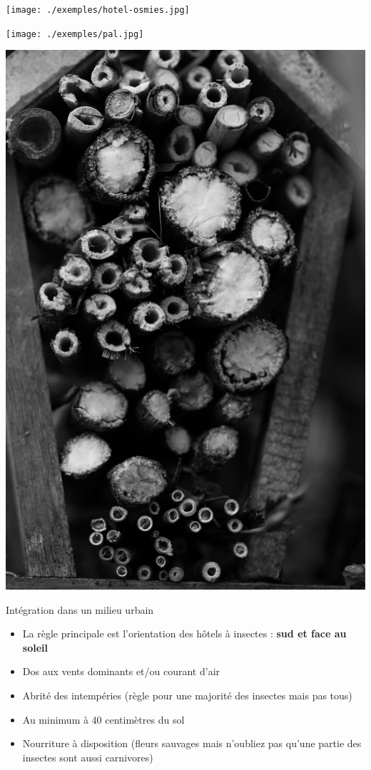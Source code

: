 \documentclass{beamer}
\begin{document}
\begin{frame}
        \texttt{[image: ./exemples/hotel-osmies.jpg]}
\end{frame}
\begin{frame}
        \texttt{[image: ./exemples/pal.jpg]}
\end{frame}
\begin{frame}
        \includegraphics[scale=0.04]{./exemples/tige-moelle.jpg}
\end{frame}



\begin{frame}{Intégration dans un milieu urbain}
        \begin{itemize}
                \item La règle principale est l'orientation des hôtels à insectes : {\bf sud et face au soleil}
                \item Dos aux vents dominants et/ou courant d'air
                \item Abrité des intempéries (règle pour une majorité des insectes mais pas tous)
                \item Au minimum à 40 centimètres du sol
                \item Nourriture à disposition (fleurs sauvages mais n'oubliez pas qu'une partie des insectes sont aussi carnivores)
        \end{itemize}
\end{frame}
\end{document}

